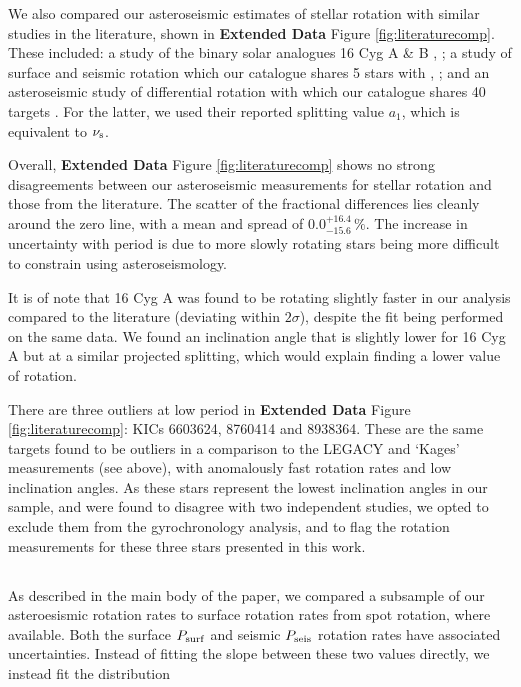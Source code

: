We also compared our asteroseismic estimates of stellar rotation with similar studies in the literature, shown in \textbf{Extended Data} Figure \ref{fig:literaturecomp}. These included: a study of the binary solar analogues 16 Cyg A \& B \cite{m_davies+2015}, ; a study of surface and seismic rotation which our catalogue shares 5 stars with \cite{m_nielsen+2015}, ; and an asteroseismic study of differential rotation with which our catalogue shares 40 targets \cite{m_benomar+2018}. For the latter, we used their reported splitting value $a_1$, which is equivalent to $\nu_{\rm s}$. 

Overall,  \textbf{Extended Data} Figure \ref{fig:literaturecomp} shows no strong disagreements between our asteroseismic measurements for stellar rotation and those from the literature. The scatter of the fractional differences lies cleanly around the zero line, with a mean and spread of $0.0_{-15.6}^{+16.4}\, \%$. The increase in uncertainty with period is due to more slowly rotating stars being more difficult to constrain using asteroseismology.

It is of note that 16 Cyg A was found to be rotating slightly faster in our analysis compared to the literature \cite{m_davies+2015} (deviating within $2\sigma$), despite the fit being performed on the same data. We found an inclination angle that is slightly lower for 16 Cyg A but at a similar projected splitting, which would explain finding a lower value of rotation.

There are three outliers at low period in  \textbf{Extended Data} Figure \ref{fig:literaturecomp}: KICs 6603624, 8760414 and 8938364. These are the same targets found to be outliers in a comparison to the LEGACY and `Kages' measurements (see above), with anomalously fast rotation rates and low inclination angles. As these stars represent the lowest inclination angles in our sample, and were found to disagree with two independent studies, we opted to exclude them from the gyrochronology analysis, and to flag the rotation measurements for these three stars presented in this work.

\subsection{}
As described in the main body of the paper, we compared a subsample of our asteroesismic rotation rates to surface rotation rates from spot rotation, where available. Both the surface $P_{\rm surf}$ and seismic $P_{\rm seis}$ rotation rates have associated uncertainties. Instead of fitting the slope between these two values directly, we instead fit the distribution

